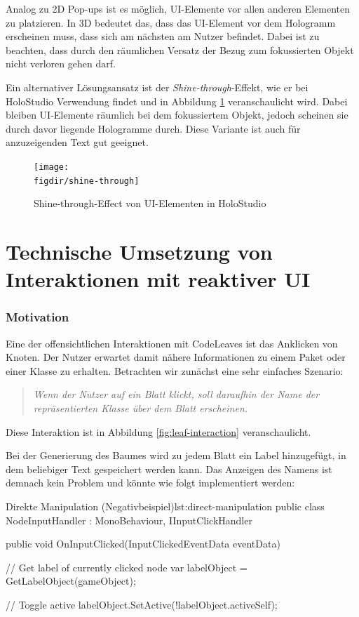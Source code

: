 Analog zu 2D Pop-ups ist es möglich, UI-Elemente vor allen anderen Elementen zu platzieren. In 3D bedeutet das, dass das UI-Element vor dem Hologramm erscheinen muss, dass sich am nächsten am Nutzer befindet. Dabei ist zu beachten, dass durch den räumlichen Versatz der Bezug zum fokussierten Objekt nicht verloren gehen darf.

Ein alternativer Lösungsansatz ist der \textit{Shine-through}-Effekt, wie er bei HoloStudio Verwendung findet und in Abbildung \ref{fig:shine-through} veranschaulicht wird. Dabei bleiben UI-Elemente räumlich bei dem fokussiertem Objekt, jedoch scheinen sie durch davor liegende Hologramme durch. Diese Variante ist auch für anzuzeigenden Text gut geeignet.

\begin{figure}[htb]
  \texttt{[image: \\figdir/shine-through]}
  \caption{Shine-through-Effect von UI-Elementen in HoloStudio \cite{windows2017casestudy3}}
  \label{fig:shine-through}
\end{figure}

\section{Technische Umsetzung von Interaktionen mit reaktiver UI}

\subsubsection*{Motivation}
Eine der offensichtlichen Interaktionen mit CodeLeaves ist das Anklicken von Knoten. Der Nutzer erwartet damit nähere Informationen zu einem Paket oder einer Klasse zu erhalten. Betrachten wir zunächst eine sehr einfaches Szenario:

\begin{quotation}
  \textit{Wenn der Nutzer auf ein Blatt klickt, soll daraufhin der Name der repräsentierten Klasse über dem Blatt erscheinen.}
\end{quotation}

Diese Interaktion ist in Abbildung \ref{fig:leaf-interaction} veranschaulicht.

Bei der Generierung des Baumes wird zu jedem Blatt ein Label hinzugefügt, in dem beliebiger Text gespeichert werden kann. Das Anzeigen des Namens ist demnach kein Problem und könnte wie folgt implementiert werden:

\begin{codesnippet}{Direkte Manipulation (Negativbeispiel)}{lst:direct-manipulation}
public class NodeInputHandler : MonoBehaviour, IInputClickHandler
{
    public void OnInputClicked(InputClickedEventData eventData)
    {
        // Get label of currently clicked node
        var labelObject = GetLabelObject(gameObject);

        // Toggle active
        labelObject.SetActive(!labelObject.activeSelf);
    }
}
\end{codesnippet}

